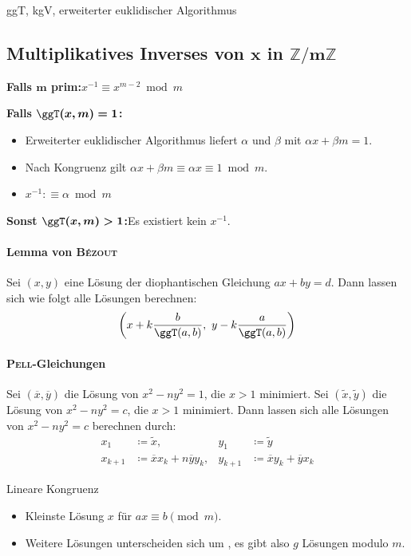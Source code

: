\begin{algorithm}{ggT, kgV, erweiterter euklidischer Algorithmus}
\end{algorithm}

\subsection{Multiplikatives Inverses von $\boldsymbol{x}$ in $\boldsymbol{\mathbb{Z}/m\mathbb{Z}}$}
\textbf{Falls $\boldsymbol{m}$ prim:}\quad $x^{-1} \equiv x^{m-2} \bmod m$

\textbf{Falls $\boldsymbol{\ggT(x, m) = 1}$:}
\begin{itemize}
	\item Erweiterter euklidischer Algorithmus liefert $\alpha$ und $\beta$ mit
	$\alpha x + \beta m = 1$.
	\item Nach Kongruenz gilt $\alpha x + \beta m \equiv \alpha x \equiv 1 \bmod m$.
	\item $x^{-1} :\equiv \alpha \bmod m$
\end{itemize}
\textbf{Sonst $\boldsymbol{\ggT(x, m) > 1}$:}\quad Es existiert kein $x^{-1}$.

\paragraph{Lemma von \textsc{Bézout}}
Sei $(x, y)$ eine Lösung der diophantischen Gleichung $ax + by = d$.
Dann lassen sich wie folgt alle Lösungen berechnen:
\[
\left(x + k\frac{b}{\ggT(a, b)},~y - k\frac{a}{\ggT(a, b)}\right)
\]

\paragraph{\textsc{Pell}-Gleichungen}
Sei $(\overline{x}, \overline{y})$ die Lösung von $x^2 - ny^2 = 1$, die $x>1$ minimiert.
Sei $(\tilde{x}, \tilde{y})$ die Lösung von $x^2-ny^2 = c$, die $x>1$ minimiert. Dann lassen
sich alle Lösungen von $x^2-ny^2=c$ berechnen durch:
\begin{align*}
	x_1&\coloneqq \tilde{x}, & y_1&\coloneqq\tilde{y}\\
	x_{k+1}&\coloneqq \overline{x}x_k+n\overline{y}y_k, & y_{k+1}&\coloneqq\overline{x}y_k+\overline{y}x_k
\end{align*}

\begin{algorithm}{Lineare Kongruenz}
	\begin{itemize}
		\item Kleinste Lösung $x$ für $ax\equiv b\pmod{m}$.
		\item Weitere Lösungen unterscheiden sich um , es gibt
		also $g$ Lösungen modulo $m$.
	\end{itemize}
\end{algorithm}

